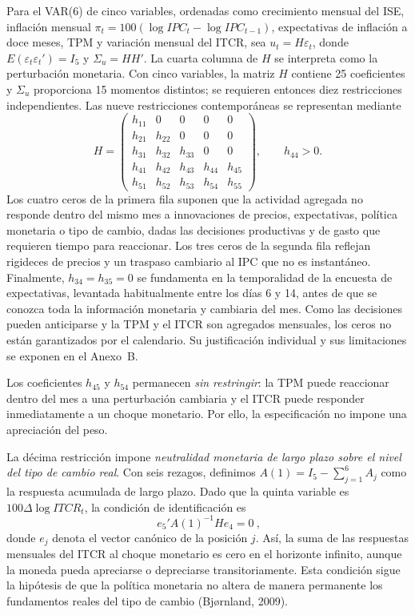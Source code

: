 \documentclass[12pt,letterpaper]{article}
\begin{document}
Para el VAR(6) de cinco variables, ordenadas como crecimiento mensual del ISE, inflación mensual $\pi_t=100(\log IPC_t-\log IPC_{t-1})$, expectativas de inflación a doce meses, TPM y variación mensual del ITCR, sea $u_t=H\varepsilon_t$, donde $E(\varepsilon_t\varepsilon_t')=I_5$ y $\Sigma_u=HH'$. La cuarta columna de $H$ se interpreta como la perturbación monetaria. Con cinco variables, la matriz $H$ contiene 25 coeficientes y $\Sigma_u$ proporciona 15 momentos distintos; se requieren entonces diez restricciones independientes. Las nueve restricciones contemporáneas se representan mediante
\begin{equation}
H=\begin{pmatrix}
h_{11}&0&0&0&0\\
h_{21}&h_{22}&0&0&0\\
h_{31}&h_{32}&h_{33}&0&0\\
h_{41}&h_{42}&h_{43}&h_{44}&h_{45}\\
h_{51}&h_{52}&h_{53}&h_{54}&h_{55}
\end{pmatrix},\qquad h_{44}>0.
\label{eq:p1_H}
\end{equation}
Los cuatro ceros de la primera fila suponen que la actividad agregada no responde dentro del mismo mes a innovaciones de precios, expectativas, política monetaria o tipo de cambio, dadas las decisiones productivas y de gasto que requieren tiempo para reaccionar. Los tres ceros de la segunda fila reflejan rigideces de precios y un traspaso cambiario al IPC que no es instantáneo. Finalmente, $h_{34}=h_{35}=0$ se fundamenta en la temporalidad de la encuesta de expectativas, levantada habitualmente entre los días 6 y 14, antes de que se conozca toda la información monetaria y cambiaria del mes. Como las decisiones pueden anticiparse y la TPM y el ITCR son agregados mensuales, los ceros no están garantizados por el calendario. Su justificación individual y sus limitaciones se exponen en el Anexo~B.

Los coeficientes $h_{45}$ y $h_{54}$ permanecen \emph{sin restringir}: la TPM puede reaccionar dentro del mes a una perturbación cambiaria y el ITCR puede responder inmediatamente a un choque monetario. Por ello, la especificación no impone una apreciación del peso.

La décima restricción impone \emph{neutralidad monetaria de largo plazo sobre el nivel del tipo de cambio real}. Con seis rezagos, definimos $A(1)=I_5-\sum_{j=1}^{6}A_j$ como la respuesta acumulada de largo plazo. Dado que la quinta variable es $100\Delta\log ITCR_t$, la condición de identificación es
\begin{equation}
\boxed{\ e_5'A(1)^{-1}He_4=0\ },
\label{eq:p1_neutralidad}
\end{equation}
donde $e_j$ denota el vector canónico de la posición $j$. Así, la suma de las respuestas mensuales del ITCR al choque monetario es cero en el horizonte infinito, aunque la moneda pueda apreciarse o depreciarse transitoriamente. Esta condición sigue la hipótesis de que la política monetaria no altera de manera permanente los fundamentos reales del tipo de cambio (Bj{\o}rnland, 2009).
\end{document}
